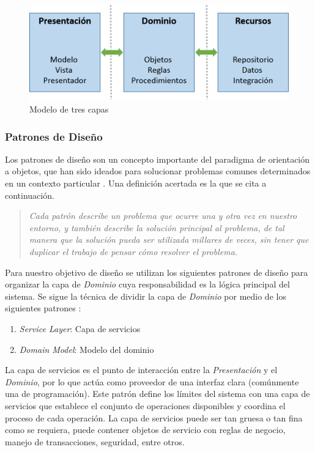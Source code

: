 \begin{figure}[H]
\begin{centering}
\includegraphics[width=0.8\columnwidth]{capitulo-5/graphics/arqui_tres_capas}
\par\end{centering}
\caption[Modelo de tres capas]{\label{fig5:tres_capas}Modelo de tres capas}

\end{figure}


\subsubsection{Patrones de Diseño}

Los patrones de diseño son un concepto importante del paradigma de
orientación a objetos, que han sido ideados para solucionar problemas
comunes determinados en un contexto particular \cite{Shalloway2004}.
Una definición acertada es la que se cita a continuación.
\begin{quotation}
\flqq{}\emph{Cada patrón describe un problema que ocurre una y otra
vez en nuestro entorno, y también describe la solución principal al
problema, de tal manera que la solución pueda ser utilizada millares
de veces, sin tener que duplicar el trabajo de pensar cómo resolver
el problema.\frqq{}} \cite{Alexander1977}
\end{quotation}
Para nuestro objetivo de diseño se utilizan los siguientes patrones
de diseño para organizar la capa de \emph{Dominio} cuya responsabilidad
es la lógica principal del sistema. Se sigue la técnica de dividir
la capa de\emph{ Dominio} por medio de los siguientes patrones \cite{Fowler2002}:
\begin{enumerate}
\item \emph{Service Layer}: Capa de servicios
\item \emph{Domain Model}: Modelo del dominio
\end{enumerate}
La capa de servicios es el punto de interacción entre la \emph{Presentación}
y el\emph{ Dominio}, por lo que actúa como proveedor de una interfaz
clara (comúnmente una  de programación). Este patrón define
los límites del sistema con una capa de servicios que establece el
conjunto de operaciones disponibles y coordina el proceso de cada
operación. La capa de servicios puede ser tan gruesa o tan fina como
se requiera, puede contener objetos de servicio con reglas de negocio,
manejo de transacciones, seguridad, entre otros.

